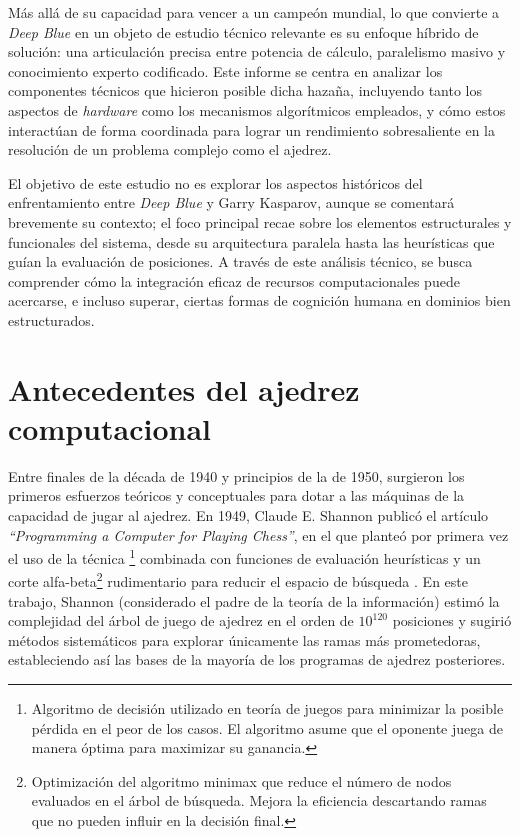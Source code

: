 \documentclass[a4paper, 12pt]{article}
\begin{document}
Más allá de su capacidad para vencer a un campeón mundial, lo 
que convierte a \textit{Deep Blue} en un objeto de estudio 
técnico relevante es su enfoque híbrido de solución: una 
articulación precisa entre potencia de cálculo, paralelismo 
masivo y conocimiento experto codificado. Este informe se centra 
en analizar los componentes técnicos que hicieron posible dicha 
hazaña, incluyendo tanto los aspectos de \emph{hardware} como los 
mecanismos algorítmicos empleados, y cómo estos interactúan de 
forma coordinada para lograr un rendimiento sobresaliente en la 
resolución de un problema complejo como el ajedrez.

El objetivo de este estudio no es explorar los aspectos 
históricos del enfrentamiento entre \textit{Deep Blue} y Garry 
Kasparov, aunque se comentará brevemente su contexto; el foco 
principal recae sobre los elementos estructurales y funcionales 
del sistema, desde su arquitectura paralela hasta las 
heurísticas que guían la evaluación de posiciones. A través de 
este análisis técnico, se busca comprender cómo la integración 
eficaz de recursos computacionales puede acercarse, e incluso 
superar, ciertas formas de cognición humana en dominios bien 
estructurados.


\newpage


\section{Antecedentes del ajedrez computacional}


Entre finales de la década de 1940 y principios de la de 1950, 
surgieron los primeros esfuerzos teóricos y conceptuales para 
dotar a las máquinas de la capacidad de jugar al ajedrez. En 
1949, Claude E. Shannon publicó el artículo \emph{“Programming a 
Computer for Playing Chess”}, en el que planteó por primera vez 
el uso de la técnica \footnote{Algoritmo de decisión utilizado en teoría de juegos para minimizar la posible pérdida en el peor de los casos. El algoritmo asume que el oponente juega de manera óptima para maximizar su ganancia.} 
combinada con funciones de 
evaluación heurísticas y un corte alfa-beta\footnote{Optimización del algoritmo minimax que reduce el número de nodos evaluados en el árbol de búsqueda. Mejora la eficiencia descartando ramas que no pueden influir en la decisión final.} 
rudimentario para 
reducir el espacio de búsqueda \cite{shannon1950xxii}. En este 
trabajo, Shannon (considerado el padre de la teoría de la 
información) estimó la complejidad del árbol de juego de ajedrez 
en el orden de \(10^{120}\) posiciones y sugirió métodos 
sistemáticos para explorar únicamente las ramas más prometedoras, 
estableciendo así las bases de la mayoría de los programas de 
ajedrez posteriores.
\end{document}
